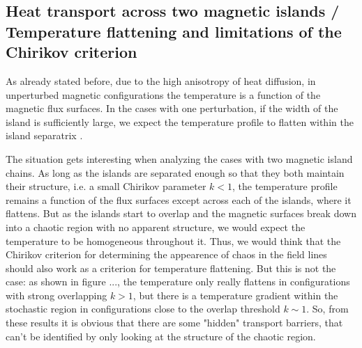 \subsection{Heat transport across two magnetic islands / Temperature flattening and limitations of the Chirikov criterion}
As already stated before, due to the high anisotropy of heat diffusion, in unperturbed magnetic configurations the temperature is a function of the magnetic flux surfaces. In the cases with one perturbation, if the width of the island is sufficiently large, we expect the temperature profile to flatten within the island separatrix \cite{}.

The situation gets interesting when analyzing the cases with two magnetic island chains. As long as the islands are separated enough so that they both maintain their structure, i.e. a small Chirikov parameter $k<1$, the temperature profile remains a function of the flux surfaces except across each of the islands, where it flattens. But as the islands start to overlap and the magnetic surfaces break down into a chaotic region with no apparent structure, we would expect the temperature to be homogeneous throughout it. Thus, we would think that the Chirikov criterion for determining the appearence of chaos in the field lines should also work as a criterion for temperature flattening. But this is not the case: as shown in figure ..., the temperature only really flattens in configurations with strong overlapping $k>1$, but there is a temperature gradient within the stochastic region in configurations close to the overlap threshold $k\sim 1$. So, from these results it is obvious that there are some "hidden" transport barriers, that can't be identified by only looking at the structure of the chaotic region. 